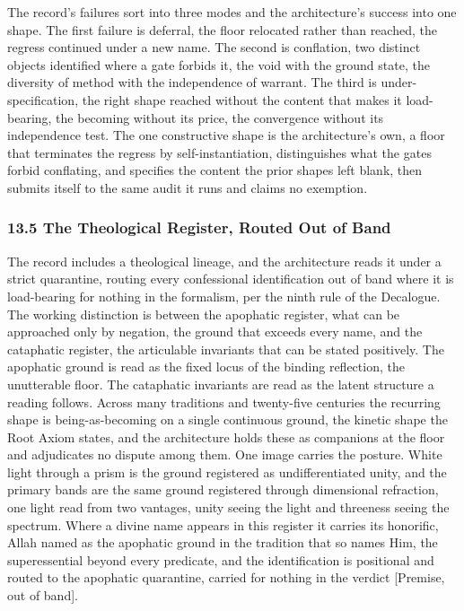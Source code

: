 \documentclass[10pt,twocolumn]{article}
\begin{document}
The record's failures sort into three modes and the architecture's
success into one shape. The first failure is deferral, the floor
relocated rather than reached, the regress continued under a new name.
The second is conflation, two distinct objects identified where a gate
forbids it, the void with the ground state, the diversity of method with
the independence of warrant. The third is under-specification, the right
shape reached without the content that makes it load-bearing, the
becoming without its price, the convergence without its independence
test. The one constructive shape is the architecture's own, a floor that
terminates the regress by self-instantiation, distinguishes what the
gates forbid conflating, and specifies the content the prior shapes left
blank, then submits itself to the same audit it runs and claims no
exemption.

\hypertarget{the-theological-register-routed-out-of-band}{%
\subsubsection{13.5 The Theological Register, Routed Out of
Band}\label{the-theological-register-routed-out-of-band}}

The record includes a theological lineage, and the architecture reads it
under a strict quarantine, routing every confessional identification out
of band where it is load-bearing for nothing in the formalism, per the
ninth rule of the Decalogue. The working distinction is between the
apophatic register, what can be approached only by negation, the ground
that exceeds every name, and the cataphatic register, the articulable
invariants that can be stated positively. The apophatic ground is read
as the fixed locus of the binding reflection, the unutterable floor. The
cataphatic invariants are read as the latent structure a reading
follows. Across many traditions and twenty-five centuries the recurring
shape is being-as-becoming on a single continuous ground, the kinetic
shape the Root Axiom states, and the architecture holds these as
companions at the floor and adjudicates no dispute among them. One image
carries the posture. White light through a prism is the ground
registered as undifferentiated unity, and the primary bands are the same
ground registered through dimensional refraction, one light read from
two vantages, unity seeing the light and threeness seeing the spectrum.
Where a divine name appears in this register it carries its honorific,
Allah named as the apophatic ground in the tradition that so names Him,
the superessential beyond every predicate, and the identification is
positional and routed to the apophatic quarantine, carried for nothing
in the verdict {[}Premise, out of band{]}.
\end{document}
